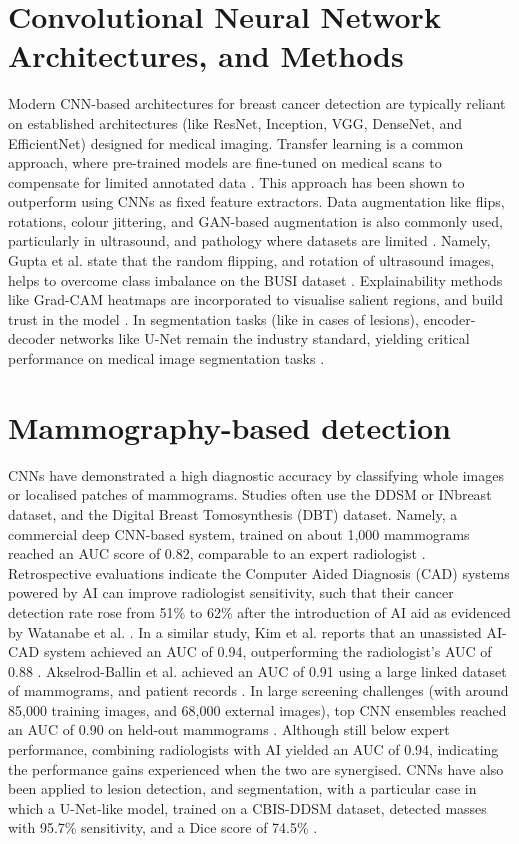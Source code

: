 \documentclass[../main]{subfiles}
\begin{document}
\section{Convolutional Neural Network Architectures, and Methods}
\label{sec:cnn-arch}
Modern CNN-based architectures for breast cancer detection are typically reliant on established architectures (like ResNet, Inception, VGG, DenseNet, and EfficientNet) designed for medical imaging. Transfer learning is a common approach, where pre-trained models are fine-tuned on medical scans to compensate for limited annotated data \autocite{srikantamurthy2023classification}. This approach has been shown to outperform using CNNs as fixed feature extractors. Data augmentation like flips, rotations, colour jittering, and GAN-based augmentation is also commonly used, particularly in ultrasound, and pathology where datasets are limited \autocite{latha2024revolutionizing}. Namely, Gupta et al. state that the random flipping, and rotation of ultrasound images, helps to overcome class imbalance on the BUSI dataset \autocite{latha2024revolutionizing}. Explainability methods like Grad-CAM heatmaps are incorporated to visualise salient regions, and build trust in the model \autocite{latha2024revolutionizing} \autocite{kaba2024explainable}. In segmentation tasks (like in cases of lesions), encoder-decoder networks like U-Net remain the industry standard, yielding critical performance on medical image segmentation tasks \autocite{jiang2024deep}.

\section{Mammography-based detection}
\label{sec:mammography-cnn}
CNNs have demonstrated a high diagnostic accuracy by classifying whole images or localised patches of mammograms. Studies often use the DDSM or INbreast dataset, and the Digital Breast Tomosynthesis (DBT) dataset. Namely, a commercial deep CNN-based system, trained on about 1,000 mammograms reached an AUC score of 0.82, comparable to an expert radiologist \autocite{carriero2024deep}. Retrospective evaluations indicate the Computer Aided Diagnosis (CAD) systems powered by AI can improve radiologist sensitivity, such that their cancer detection rate rose from 51\% to 62\% after the introduction of AI aid as evidenced by Watanabe et al. \autocite{carriero2024deep}. In a similar study, Kim et al. reports that an unassisted AI-CAD system achieved an AUC of 0.94, outperforming the radiologist's AUC of 0.88 \autocite{carriero2024deep}. Akselrod-Ballin et al. achieved an AUC of 0.91 using a large linked dataset of mammograms, and patient records \autocite{carriero2024deep}. In large screening challenges (with around 85,000 training images, and 68,000 external images), top CNN ensembles reached an AUC of 0.90 on held-out mammograms \autocite{carriero2024deep}. Although still below expert performance, combining radiologists with AI yielded an AUC of 0.94, indicating the performance gains experienced when the two are synergised. CNNs have also been applied to lesion detection, and segmentation, with a particular case in which a U-Net-like model, trained on a CBIS-DDSM dataset, detected masses with 95.7\% sensitivity, and a Dice score of 74.5\% \autocite{jiang2024deep}.
\end{document}
